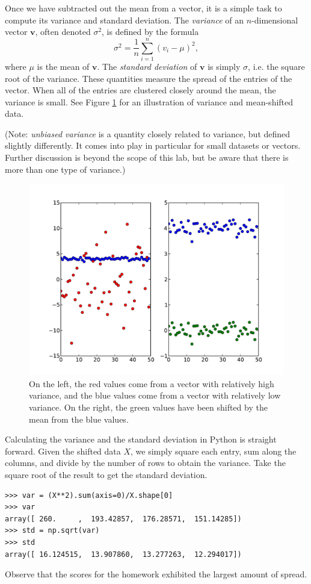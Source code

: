 Once we have subtracted out the mean from a vector, it is a simple task to compute its variance and standard deviation.
The \emph{variance} of an $n$-dimensional vector $\mathbf{v}$, often denoted $\sigma^2$, is defined by the formula
$$
\sigma^2 = \frac{1}{n}\displaystyle\sum_{i=1}^n (v_i - \mu)^2,
$$
where $\mu$ is the mean of $\mathbf{v}$. The \emph{standard deviation} of $\mathbf{v}$ is simply $\sigma$, i.e. the square
root of the variance. These quantities measure the spread of the entries of the vector. When all of the entries are clustered
closely around the mean, the variance is small. See Figure \ref{fig:variance} for an illustration of variance and mean-shifted data.

(Note: \emph{unbiased variance} is a quantity closely related to variance, but defined slightly differently. It comes into play
in particular for small datasets or vectors. Further discussion is beyond the scope of this lab, but be aware that there is
more than one type of variance.)

\begin{figure}[h]
\includegraphics[width=\textwidth]{variance}
\caption{On the left, the red values come from a vector with relatively high variance,
         and the blue values come from a vector with relatively low variance.
         On the right, the green values have been shifted by the mean from the blue values.}
\label{fig:variance}
\end{figure}

Calculating the variance and the standard deviation in Python is straight forward.
Given the shifted data $X$, we simply square each entry, sum along the columns, and divide by the number of rows
to obtain the variance. Take the square root of the result to get the standard deviation.
\begin{lstlisting}
>>> var = (X**2).sum(axis=0)/X.shape[0]
>>> var
array([ 260.     ,  193.42857,  176.28571,  151.14285])
>>> std = np.sqrt(var)
>>> std
array([ 16.124515,  13.907860,  13.277263,  12.294017])
\end{lstlisting}
Observe that the scores for the homework exhibited the largest amount of spread.

